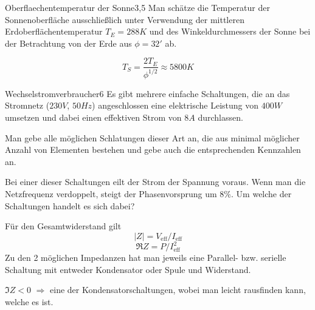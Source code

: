 


\begin{problem}{Oberflaechentemperatur der Sonne}{3,5}
Man schätze die Temperatur der Sonnenoberfläche ausschließlich unter Verwendung der mittleren Erdoberflächentemperatur $T_E = 288 \unit{K}$ und des Winkeldurchmessers der Sonne bei der Betrachtung von der Erde aus $\phi = 32'$ ab.
\begin{solution}
\[
T_S = \frac{2 T_E}{\phi^{1/2}} \approx 5800 \unit{K}
\]
\end{solution}
\end{problem}


\begin{problem}{Wechselstromverbraucher}{6}
Es gibt mehrere einfache Schaltungen, die an das Stromnetz ($230 \unit{V}$, $50 \unit{Hz}$) angeschlossen eine elektrische Leistung von $400 \unit{W}$ umsetzen und dabei einen effektiven Strom von $8 \unit{A}$ durchlassen.
\begin{abcenum}
\item Man gebe alle möglichen Schlatungen dieser Art an, die aus minimal möglicher Anzahl von Elementen bestehen und gebe auch die entsprechenden Kennzahlen an.
\item Bei einer dieser Schaltungen eilt der Strom der Spannung voraus. Wenn man die Netzfrequenz verdoppelt, steigt der Phasenvorsprung um $8\%$. Um welche der Schaltungen handelt es sich dabei?
\end{abcenum}

\begin{solution}
\begin{abcenum}
\item Für den Gesamtwiderstand gilt
\[
|Z| = V_\mathrm{eff} / I_\mathrm{eff}
\]
\[
\Re Z = P / I_\mathrm{eff}^2
\]
Zu den 2 möglichen Impedanzen hat man jeweils eine Parallel- bzw. serielle Schaltung mit entweder Kondensator oder Spule und Widerstand.
\item $\Im Z < 0$ $\Rightarrow$ eine der Kondensatorschaltungen, wobei man leicht rausfinden kann, welche es ist.
\end{abcenum}
\end{solution}
\end{problem}


